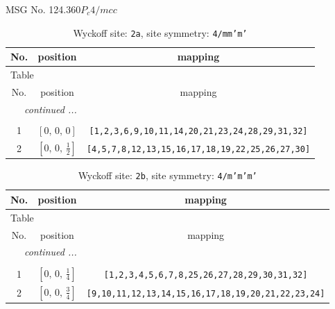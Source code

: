 \documentclass[fleqn,8pt]{jsarticle}
\begin{document}
\setcounter{MaxMatrixCols}{32}

\renewcommand{\tablename}{Table~}
\renewcommand{\figurename}{Figure~}
\begin{center}
\LARGE
MSG No. 124.360\quad$P_{c}4/mcc$
\end{center}
\renewcommand{\arraystretch}{1.2}
\begin{longtable}{ccc}
\caption{Wyckoff site: {\tt 2a}, site symmetry: {\tt 4/mm'm'}}
 \\
 \hline \hline
No. & position & mapping \\ \hline \endfirsthead

\multicolumn{2}{l}{\tablename\ \thetable{}} \\
 \hline \hline
No. & position & mapping \\ \hline \endhead

 \hline \hline
\multicolumn{2}{r}{\footnotesize\it continued ...} \\ \endfoot

 \hline \hline
\multicolumn{2}{r}{} \\ \endlastfoot

1 & $\left[ 0,\, 0,\, 0 \right]$ & {\tt [1,2,3,6,9,10,11,14,20,21,23,24,28,29,31,32]} \\ \hline
2 & $\left[ 0,\, 0,\, \frac{1}{2} \right]$ & {\tt [4,5,7,8,12,13,15,16,17,18,19,22,25,26,27,30]} \\
\end{longtable}
\renewcommand{\arraystretch}{1.2}
\begin{longtable}{ccc}
\caption{Wyckoff site: {\tt 2b}, site symmetry: {\tt 4/m'm'm'}}
 \\
 \hline \hline
No. & position & mapping \\ \hline \endfirsthead

\multicolumn{2}{l}{\tablename\ \thetable{}} \\
 \hline \hline
No. & position & mapping \\ \hline \endhead

 \hline \hline
\multicolumn{2}{r}{\footnotesize\it continued ...} \\ \endfoot

 \hline \hline
\multicolumn{2}{r}{} \\ \endlastfoot

1 & $\left[ 0,\, 0,\, \frac{1}{4} \right]$ & {\tt [1,2,3,4,5,6,7,8,25,26,27,28,29,30,31,32]} \\ \hline
2 & $\left[ 0,\, 0,\, \frac{3}{4} \right]$ & {\tt [9,10,11,12,13,14,15,16,17,18,19,20,21,22,23,24]} \\
\end{longtable}
\end{document}
